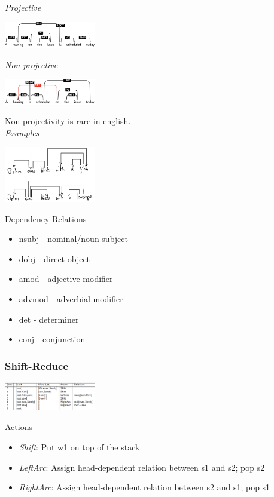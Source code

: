 \documentclass[8pt]{extarticle} %
\begin{document}
\begin{multicols*}{3}
\textit{Projective}
\begin{center}
    \includegraphics[width=0.3\textwidth]{media/dependency-projective.png}
\end{center}
\textit{Non-projective}
\begin{center}
    \includegraphics[width=0.3\textwidth]{media/dependency-non-projecitve.png}
\end{center}
Non-projectivity is rare in english.\\
\textit{Examples}
\begin{center}
    \includegraphics[width=0.3\textwidth]{media/dependency-parse.png}
\end{center}
\underline{Dependency Relations}
\begin{itemize}[label=\textbullet, labelsep=0.3em, leftmargin=0.5em, itemsep=0em]
\item nsubj - nominal/noun subject
\item dobj - direct object
\item amod - adjective modifier
\item advmod - adverbial modifier
\item det - determiner
\item conj - conjunction
\end{itemize}

\subsubsection*{Shift-Reduce}
\begin{center}
    \includegraphics[width=0.3\textwidth]{media/shift-reduce.png}
\end{center}

\underline{Actions}
\begin{itemize}[label=\textbullet, labelsep=0.3em, leftmargin=0.5em, itemsep=0em]
    \item \textit{Shift}: Put w1 on top of the stack.
    \item \textit{LeftArc}: Assign head-dependent relation between s1 and s2; pop s2
    \item \textit{RightArc}: Assign head-dependent relation between s2 and s1; pop s1
\end{itemize}


\end{multicols*}
\end{document}

